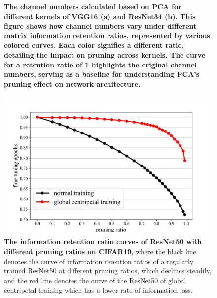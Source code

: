 \documentclass[sigconf, 10pt]{acmart}
\begin{document}
\begin{figure}
\begin{subfigure}{1\linewidth}
    \caption{}
    \label{fig:6b}
  \end{subfigure}
  \caption{\textbf{The channel numbers calculated based on PCA for different kernels of VGG16 \textbf{(a)} and ResNet34 \textbf{(b).} This figure shows how channel numbers vary under different matrix information retention ratios, represented by various colored curves. Each color signifies a different ratio, detailing the impact on pruning across kernels. The curve for a retention ratio of 1 highlights the original channel numbers, serving as a baseline for understanding PCA's pruning effect on network architecture.}}
  \label{fig:6}
\end{figure}


\begin{figure}
  \centering
  \includegraphics[width=\linewidth]{Fig7.pdf}
   \caption{\textbf{The information retention ratio curves of ResNet50 with different pruning ratios on CIFAR10}, where the black line denotes the curve of information retention ratios of a regularly trained ResNet50 at different pruning ratios, which declines steadily, and the red line denotes the curve of the ResNet50 of global centripetal training which has a lower rate of information loss.}
   \label{fig:7}
\end{figure}
\end{document}
